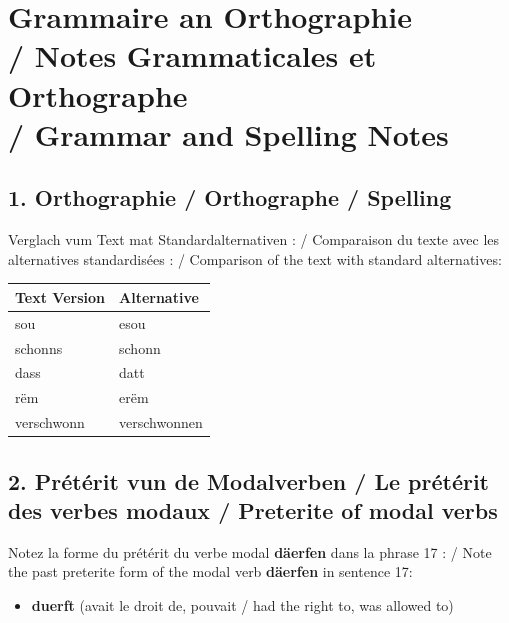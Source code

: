 \vspace{0.3cm}

\section[Grammaire an Orthographie]{Grammaire an Orthographie \\/ Notes Grammaticales et Orthographe \\/ Grammar and Spelling Notes}

\subsection*{1. Orthographie / Orthographe / Spelling}
Verglach vum Text mat Standardalternativen : / Comparaison du texte avec les alternatives standardisées : / Comparison of the text with standard alternatives:

\begin{tabular}{ll}
    \toprule
    \textbf{Text Version} & \textbf{Alternative} \\
    \midrule
    sou & esou \\
    schonns & schonn \\
    dass & datt \\
    rëm & erëm \\
    verschwonn & verschwonnen \\
    \bottomrule
\end{tabular}

\subsection*{2. Prétérit vun de Modalverben / Le prétérit des verbes modaux / Preterite of modal verbs}
Notez la forme du prétérit du verbe modal \textbf{däerfen} dans la phrase 17 : / Note the past preterite form of the modal verb \textbf{däerfen} in sentence 17:
\begin{itemize}
    \item \textbf{duerft} (avait le droit de, pouvait / had the right to, was allowed to)
\end{itemize}

